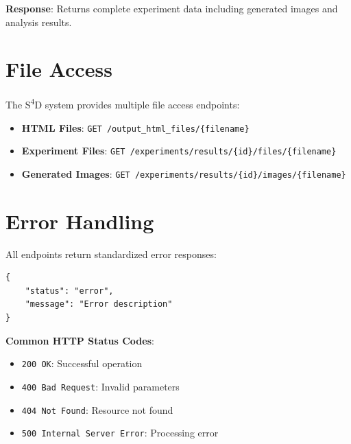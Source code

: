 \textbf{Response}: Returns complete experiment data including generated images and analysis results.

\section{File Access}
\label{sec:file-access}

The S\textsuperscript{4}D system provides multiple file access endpoints:

\begin{itemize}
    \item \textbf{HTML Files}: \texttt{GET /output\_html\_files/\{filename\}}
    \item \textbf{Experiment Files}: \texttt{GET /experiments/results/\{id\}/files/\{filename\}}
    \item \textbf{Generated Images}: \texttt{GET /experiments/results/\{id\}/images/\{filename\}}
\end{itemize}

\section{Error Handling}
\label{sec:error-handling}

All endpoints return standardized error responses:

\begin{verbatim}
{
    "status": "error",
    "message": "Error description"
}
\end{verbatim}

\textbf{Common HTTP Status Codes}:
\begin{itemize}
    \item \texttt{200 OK}: Successful operation
    \item \texttt{400 Bad Request}: Invalid parameters
    \item \texttt{404 Not Found}: Resource not found
    \item \texttt{500 Internal Server Error}: Processing error
\end{itemize} 
